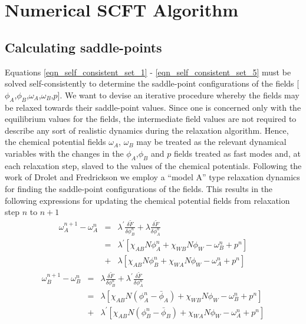 \documentclass[onecolumn,amsmath,amssymb,floatfix]{elsart}
\begin{document}
\section{Numerical SCFT Algorithm}
\label{sec_scft_algorithm}


\subsection{Calculating saddle-points}
\label{subsec_saddle_points}


Equations \ref{eqn_self_consistent_set_1} -
\ref{eqn_self_consistent_set_5} must be solved self-consistently
to determine the saddle-point configurations of the fields
[$\phi_A$,$\phi_B$,$\omega_A$,$\omega_B$,$p$].
We want to devise
an iterative procedure whereby the fields may be relaxed towards
their saddle-point values.
Since one is concerned only with the
equilibrium values for the fields, the intermediate field values
are not required to describe any sort of realistic dynamics during
the relaxation algorithm.
Hence, the chemical potential fields
$\omega_A$, $\omega_B$ may be treated as the relevant dynamical
variables with the changes in the $\phi_A$,$\phi_B$ and $p$ fields
treated as fast modes and, at each relaxation step, slaved to the
values of the chemical potentials.
Following the work of Drolet and Fredrickson \cite{drolet99,glenn_review_02} we
employ a ``model A'' type relaxation dynamics
\cite{halperin_rev77} for finding the saddle-point configurations of the fields.
This results in the following expressions for updating the chemical potential
fields from relaxation step $n$ to $n+1$
%
 \begin{eqnarray}
 \label{eq_relaxation_scheme_2}
   \omega_A^{n+1} - \omega_A^{n}
   & = &
    \lambda^{'} \frac{\delta {\tilde F}}{\delta \phi_B^n} +
    \lambda     \frac{\delta {\tilde F}}{\delta \phi_A^n} \\
   & = &
   \nonumber
    \lambda^{'} \left [ \chi_{AB} N \phi_A^n +
                        \chi_{WB} N \phi_W - \omega_B^n + p^n  \right ] \\
   \nonumber
   & + &
    \lambda     \left [ \chi_{AB} N \phi_B^n +
                        \chi_{WA} N \phi_W - \omega_A^n + p^n \right ]
 \end{eqnarray}
%
 \begin{eqnarray}
 \label{eq_relaxation_scheme_3}
   \omega_B^{n+1} - \omega_B^{n}
   & = &
    \lambda         \frac{\delta {\tilde F}}{\delta \phi_B^n} +
    \lambda^{'}     \frac{\delta {\tilde F}}{\delta \phi_A^n} \\
   & = &
   \nonumber
    \lambda     \left [ \chi_{AB} N (\phi_A^n - \bar{\phi}_A) +
                        \chi_{WB} N \phi_W - \omega_B^n + p^n  \right ] \\
   \nonumber
   & + &
    \lambda^{'} \left [ \chi_{AB} N (\phi_B^n - \bar{\phi}_B) +
                        \chi_{WA} N \phi_W - \omega_A^n + p^n \right ]
 \end{eqnarray}
\end{document}
